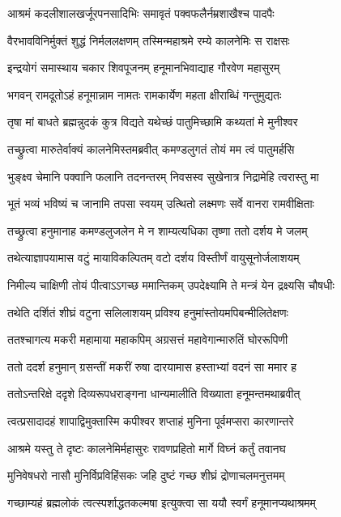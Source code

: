 \twolineshloka
{आश्रमं कदलीशालखर्जूरपनसादिभिः}
{समावृतं पक्वफलैर्नम्रशाखैश्च पादपैः} %

\twolineshloka
{वैरभावविनिर्मुक्तं शुद्धं निर्मललक्षणम्}
{तस्मिन्महाश्रमे रम्ये कालनेमिः स राक्षसः} %

\twolineshloka
{इन्द्रयोगं समास्थाय चकार शिवपूजनम्}
{हनूमानभिवाद्याह गौरवेण महासुरम्} %

\twolineshloka
{भगवन् रामदूतोऽहं हनूमान्नाम नामतः}
{रामकार्येण महता क्षीराब्धिं गन्तुमुद्यतः} %

\twolineshloka
{तृषा मां बाधते ब्रह्मन्नुदकं कुत्र विद्यते}
{यथेच्छं पातुमिच्छामि कथ्यतां मे मुनीश्वर} %

\twolineshloka
{तच्छ्रुत्वा मारुतेर्वाक्यं कालनेमिस्तमब्रवीत्}
{कमण्डलुगतं तोयं मम त्वं पातुमर्हसि} %

\twolineshloka
{भुङ्क्ष्व चेमानि पक्वानि फलानि तदनन्तरम्}
{निवसस्व सुखेनात्र निद्रामेहि त्वरास्तु मा} %

\twolineshloka
{भूतं भव्यं भविष्यं च जानामि तपसा स्वयम्}
{उत्थितो लक्ष्मणः सर्वे वानरा रामवीक्षिताः} %

\twolineshloka
{तच्छ्रुत्वा हनुमानाह कमण्डलुजलेन मे}
{न शाम्यत्यधिका तृष्णा ततो दर्शय मे जलम्} %

\twolineshloka
{तथेत्याज्ञापयामास वटुं मायाविकल्पितम्}
{वटो दर्शय विस्तीर्णं वायुसूनोर्जलाशयम्} %

\twolineshloka
{निमील्य चाक्षिणी तोयं पीत्वाऽऽगच्छ ममान्तिकम्}
{उपदेक्ष्यामि ते मन्त्रं येन द्रक्ष्यसि चौषधीः} %

\twolineshloka
{तथेति दर्शितं शीघ्रं वटुना सलिलाशयम्}
{प्रविश्य हनुमांस्तोयमपिबन्मीलितेक्षणः} %

\twolineshloka
{ततश्चागत्य मकरी महामाया महाकपिम्}
{अग्रसत्तं महावेगान्मारुतिं घोररूपिणी} %

\twolineshloka
{ततो ददर्श हनुमान् ग्रसन्तीं मकरीं रुषा}
{दारयामास हस्ताभ्यां वदनं सा ममार ह} %

\twolineshloka
{ततोऽन्तरिक्षे ददृशे दिव्यरूपधराङ्गना}
{धान्यमालीति विख्याता हनूमन्तमथाब्रवीत्} %

\twolineshloka
{त्वत्प्रसादादहं शापाद्विमुक्तास्मि कपीश्वर}
{शप्ताहं मुनिना पूर्वमप्सरा कारणान्तरे} %

\twolineshloka
{आश्रमे यस्तु ते दृष्टः कालनेमिर्महासुरः}
{रावणप्रहितो मार्गे विघ्नं कर्तुं तवानघ} %

\twolineshloka
{मुनिवेषधरो नासौ मुनिर्विप्रविहिंसकः}
{जहि दुष्टं गच्छ शीघ्रं द्रोणाचलमनुत्तमम्} %

\twolineshloka
{गच्छाम्यहं ब्रह्मलोकं त्वत्स्पर्शाद्धतकल्मषा}
{इत्युक्त्वा सा ययौ स्वर्गं हनूमानप्यथाश्रमम्} %

